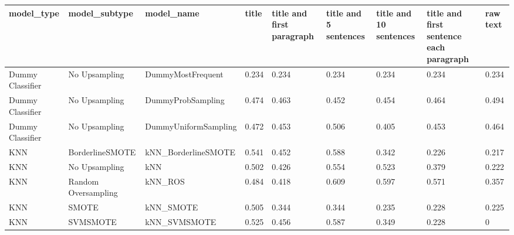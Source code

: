 \begin{tabular}{lllllllll}
\toprule
                  model\_type &       model\_subtype &                                   model\_name & title & title and first paragraph & title and 5 sentences & title and 10 sentences & title and first sentence each paragraph &  raw text \\
\midrule
            Dummy Classifier &       No Upsampling &                            DummyMostFrequent & 0.234 &                     0.234 &                 0.234 &                  0.234 &                                   0.234 &     0.234 \\
            Dummy Classifier &       No Upsampling &                            DummyProbSampling & 0.474 &                     0.463 &                 0.452 &                  0.454 &                                   0.464 &     0.494 \\
            Dummy Classifier &       No Upsampling &                         DummyUniformSampling & 0.472 &                     0.453 &                 0.506 &                  0.405 &                                   0.453 &     0.464 \\
                         KNN &     BorderlineSMOTE &                          kNN\_BorderlineSMOTE & 0.541 &                     0.452 &                 0.588 &                  0.342 &                                   0.226 &     0.217 \\
                         KNN &       No Upsampling &                                          kNN & 0.502 &                     0.426 &                 0.554 &                  0.523 &                                   0.379 &     0.222 \\
                         KNN & Random Oversampling &                                      kNN\_ROS & 0.484 &                     0.418 &                 0.609 &                  0.597 &                                   0.571 &     0.357 \\
                         KNN &               SMOTE &                                    kNN\_SMOTE & 0.505 &                     0.344 &                 0.344 &                  0.235 &                                   0.228 &     0.225 \\
                         KNN &            SVMSMOTE &                                 kNN\_SVMSMOTE & 0.525 &                     0.456 &                 0.587 &                  0.349 &                                   0.228 &         0 \\

\end{tabular}
